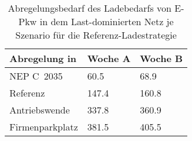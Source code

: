 {
\renewcommand{\arraystretch}{1.2}%
\begin{table}[H]
	\begin{center}
		\caption{Abregelungsbedarf des Ladebedarfs von E-Pkw in dem Last-dominierten Netz je Szenario für die Referenz-Ladestrategie}
		\begin{tabu} to 0.6\textwidth {X[1.5] X[1, r] X[1, r]}
			\toprule
			Abregelung in   \si{\mwh}    & Woche A     & Woche B     \\ \midrule
			NEP C~\num{2035}             & \num{60.5}  & \num{68.9}  \\
			Referenz                     & \num{147.4} & \num{160.8} \\
			Antriebswende                & \num{337.8} & \num{360.9} \\
			\glqq Firmenparkplatz\grqq{} & \num{381.5} & \num{405.5} \\ \bottomrule
		\end{tabu}
		\label{tab:load_dominated_epkw_cur}
	\end{center}
	\vspace{-3mm}%
\end{table}
}